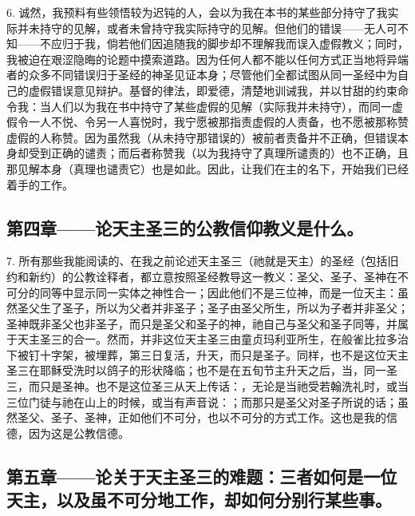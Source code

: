 6. 诚然，我预料有些领悟较为迟钝的人，会以为我在本书的某些部分持守了我实际并未持守的见解，或者未曾持守我实际持守的见解。但他们的错误——无人可不知——不应归于我，倘若他们因追随我的脚步却不理解我而误入虚假教义；同时，我被迫在艰涩隐晦的论题中摸索道路。因为任何人都不能以任何方式正当地将异端者的众多不同错误归于圣经的神圣见证本身；尽管他们全都试图从同一圣经中为自己的虚假错误意见辩护。基督的律法，即爱德，清楚地训诫我，并以甘甜的约束命令我：当人们以为我在书中持守了某些虚假的见解（实际我并未持守），而同一虚假令一人不悦、令另一人喜悦时，我宁愿被那指责虚假的人责备，也不愿被那称赞虚假的人称赞。因为虽然我（从未持守那错误的）被前者责备并不正确，但错误本身却受到正确的谴责；而后者称赞我（以为我持守了真理所谴责的）也不正确，且那见解本身（真理也谴责它）也是如此。因此，让我们在主的名下，开始我们已经着手的工作。\par


\subsection{第四章——论天主圣三的公教信仰教义是什么。}

7. 所有那些我能阅读的、在我之前论述天主圣三（祂就是天主）的圣经（包括旧约和新约）的公教诠释者，都立意按照圣经教导这一教义：圣父、圣子、圣神在不可分的同等中显示同一实体之神性合一；因此他们不是三位神，而是一位天主：虽然圣父生了圣子，所以为父者并非圣子；圣子由圣父所生，所以为子者并非圣父；圣神既非圣父也非圣子，而只是圣父和圣子的神，祂自己与圣父和圣子同等，并属于天主圣三的合一。然而，并非这位天主圣三由童贞玛利亚所生，在般雀比拉多治下被钉十字架，被埋葬，第三日复活，升天，而只是圣子。同样，也不是这位天主圣三在耶稣受洗时以鸽子的形状降临；也不是在五旬节主升天之后，当，同一圣三，而只是圣神。也不是这位圣三从天上传话：，无论是当祂受若翰洗礼时，或当三位门徒与祂在山上的时候，或当有声音说：；而那只是圣父对圣子所说的话；虽然圣父、圣子、圣神，正如他们不可分，也以不可分的方式工作。这也是我的信德，因为这是公教信德。\par


\subsection{第五章——论关于天主圣三的难题：三者如何是一位天主，以及虽不可分地工作，却如何分别行某些事。}

